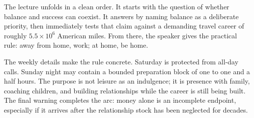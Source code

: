 The lecture unfolds in a clean order. It starts with the question of whether balance and success can coexist. It answers by naming balance as a deliberate priority, then immediately tests that claim against a demanding travel career of roughly \(5.5\times 10^{6}\) American miles. From there, the speaker gives the practical rule: away from home, work; at home, be home.

The weekly details make the rule concrete. Saturday is protected from all-day calls. Sunday night may contain a bounded preparation block of one to one and a half hours. The purpose is not leisure as an indulgence; it is presence with family, coaching children, and building relationships while the career is still being built. The final warning completes the arc: money alone is an incomplete endpoint, especially if it arrives after the relationship stock has been neglected for decades.